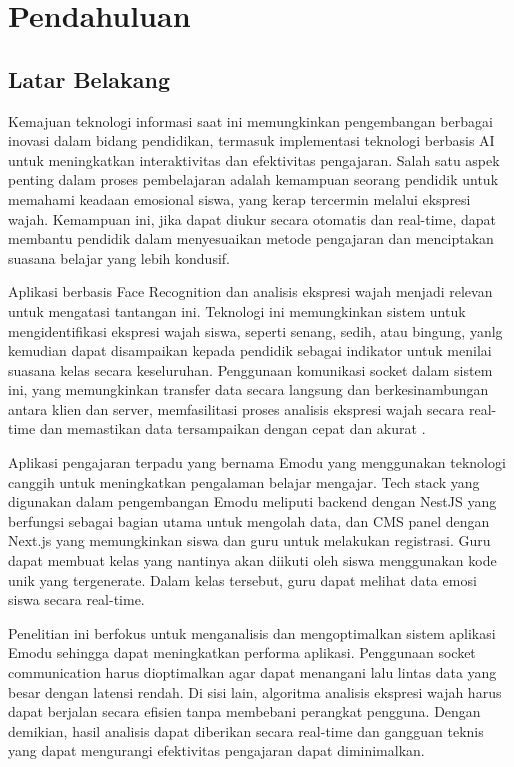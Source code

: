 \chapter{Pendahuluan}
\section{Latar Belakang}
\qquad Kemajuan teknologi informasi saat ini memungkinkan pengembangan berbagai inovasi dalam bidang pendidikan, termasuk implementasi teknologi berbasis AI untuk meningkatkan interaktivitas dan efektivitas pengajaran. Salah satu aspek penting dalam proses pembelajaran adalah kemampuan seorang pendidik untuk memahami keadaan emosional siswa, yang kerap tercermin melalui ekspresi wajah. Kemampuan ini, jika dapat diukur secara otomatis dan real-time, dapat membantu pendidik dalam menyesuaikan metode pengajaran dan menciptakan suasana belajar yang lebih kondusif.

Aplikasi berbasis Face Recognition dan analisis ekspresi wajah menjadi relevan untuk mengatasi tantangan ini. Teknologi ini memungkinkan sistem untuk mengidentifikasi ekspresi wajah siswa, seperti senang, sedih, atau bingung, yanlg kemudian dapat disampaikan kepada pendidik sebagai indikator untuk menilai suasana kelas secara keseluruhan. Penggunaan komunikasi socket dalam sistem ini, yang memungkinkan transfer data secara langsung dan berkesinambungan antara klien dan server, memfasilitasi proses analisis ekspresi wajah secara real-time dan memastikan data tersampaikan dengan cepat dan akurat \parencite{ogundeyiWebSocketRealTime2019}.

Aplikasi pengajaran terpadu yang bernama Emodu yang menggunakan teknologi canggih untuk meningkatkan pengalaman belajar mengajar. Tech stack yang digunakan dalam pengembangan Emodu meliputi backend dengan NestJS yang berfungsi sebagai bagian utama untuk mengolah data, dan CMS panel dengan Next.js yang memungkinkan siswa dan guru untuk melakukan registrasi. Guru dapat membuat kelas yang nantinya akan diikuti oleh siswa menggunakan kode unik yang tergenerate. Dalam kelas tersebut, guru dapat melihat data emosi siswa secara real-time.

Penelitian ini berfokus untuk menganalisis dan mengoptimalkan sistem aplikasi Emodu sehingga dapat meningkatkan performa aplikasi. Penggunaan socket communication harus dioptimalkan agar dapat menangani lalu lintas data yang besar dengan latensi rendah. Di sisi lain, algoritma analisis ekspresi wajah harus dapat berjalan secara efisien tanpa membebani perangkat pengguna. Dengan demikian, hasil analisis dapat diberikan secara real-time dan gangguan teknis yang dapat mengurangi efektivitas pengajaran dapat diminimalkan.

